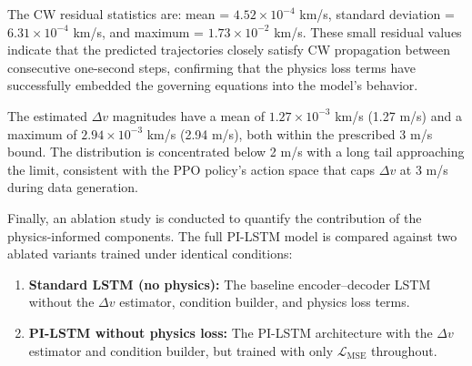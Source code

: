 \documentclass[a4paper,fleqn]{cas-dc}
\begin{document}
The CW residual statistics are: mean = $4.52 \times 10^{-4}$ km/s, standard deviation = $6.31 \times 10^{-4}$ km/s, and maximum = $1.73 \times 10^{-2}$ km/s. These small residual values indicate that the predicted trajectories closely satisfy CW propagation between consecutive one-second steps, confirming that the physics loss terms have successfully embedded the governing equations into the model's behavior.

The estimated $\Delta v$ magnitudes have a mean of $1.27 \times 10^{-3}$ km/s (1.27 m/s) and a maximum of $2.94 \times 10^{-3}$ km/s (2.94 m/s), both within the prescribed 3 m/s bound. The distribution is concentrated below 2 m/s with a long tail approaching the limit, consistent with the PPO policy's action space that caps $\Delta v$ at 3 m/s during data generation.

Finally, an ablation study is conducted to quantify the contribution of the physics-informed components. The full PI-LSTM model is compared against two ablated variants trained under identical conditions:

\begin{enumerate}
    \item \textbf{Standard LSTM (no physics):} The baseline encoder--decoder LSTM without the $\Delta v$ estimator, condition builder, and physics loss terms.
    \item \textbf{PI-LSTM without physics loss:} The PI-LSTM architecture with the $\Delta v$ estimator and condition builder, but trained with only $\mathcal{L}_{\text{MSE}}$ throughout.
\end{enumerate}
\end{document}
